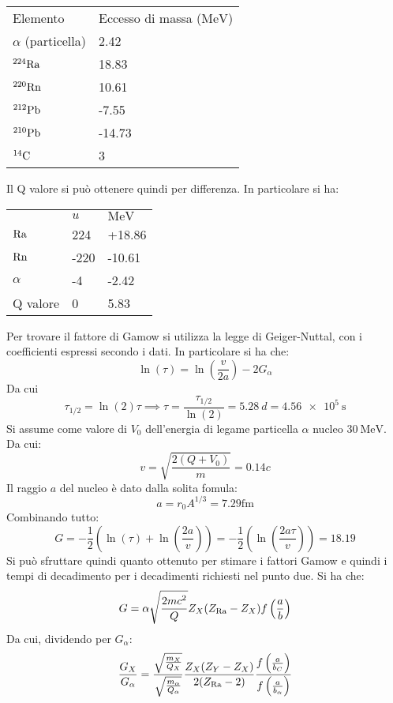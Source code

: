 \documentclass[../main.tex]{subfiles}
\begin{document}
\begin{svol}
			\begin{center}
			\begin{tabular}{ll}
				Elemento & Eccesso di massa ($\si{\mega\electronvolt}$) \\
				$ \alpha $ (particella) & 2.42 \\
				$ \mathrm{^{224}Ra} $ & 18.83 \\
				$ \mathrm{^{220}Rn} $ & 10.61 \\
				$ \mathrm{^{212}Pb} $ & -7.55 \\
				$ \mathrm{^{210}Pb} $ & -14.73 \\
				$ \mathrm{^{14}C} $ & 3 \\
			\end{tabular} 
			\end{center}
			Il Q valore si può ottenere quindi per differenza. In particolare si ha:
			\begin{center}
				\begin{tabular}{lll}
					& $ \si{u} $ & $ \si{\mega\electronvolt} $ \\
					$ \mathrm{Ra} $  & 224 & +18.86\\
					$ \mathrm{Rn} $  & -220 & -10.61 \\
					$ \alpha $ & -4 & -2.42 \\\hline
					Q valore & 0 & 5.83 \\
				\end{tabular}
			\end{center}
			Per trovare il fattore di Gamow si utilizza la legge di Geiger-Nuttal, con i coefficienti espressi secondo i dati. In particolare si ha che:
			\[ \ln(\tau)=\ln\left(\dfrac{v}{2a}\right)-2G_{\alpha} \]
			Da cui
			\[ \tau_{1/2}=\ln(2)\tau\implies\tau=\dfrac{\tau_{1/2}}{\ln(2)}=\SI{5.28}{d}=\SI{4.56e5}{\second} \]
			Si assume come valore di $ V_{0} $ dell'energia di legame particella $ \alpha $ nucleo $ \SI{30}{\mega\electronvolt} $. Da cui:
			\[ v=\sqrt{\dfrac{2(Q+V_{0})}{m}}=0.14c \]
			Il raggio $ a $ del nucleo è dato dalla solita fomula:
			\[ a=r_{0}A^{1/3}=7.29\si{\femto\meter} \]
			Combinando tutto:
			\[ G=-\dfrac{1}{2}\left(\ln(\tau)+\ln\left(\dfrac{2a}{v}\right)\right)=-\dfrac{1}{2}\left(\ln\left(\dfrac{2a\tau}{v}\right)\right)=18.19 \]
			Si può sfruttare quindi quanto ottenuto per stimare i fattori Gamow e quindi i tempi di decadimento per i decadimenti richiesti nel punto due. Si ha che:
			\[ G=\alpha\sqrt{\dfrac{2mc^{2}}{Q}}Z_{X}(Z_{\mathrm{Ra}}-Z_{X})f\left(\dfrac{a}{b}\right) \]
			Da cui, dividendo per $ G_{\alpha} $:
			\[ \dfrac{G_{X}}{G_{\alpha}}=\dfrac{\sqrt{\frac{m_{X}}{Q_{X}}}}{\sqrt{\frac{m_{\alpha}}{Q_{\alpha}}}}\dfrac{Z_{X}(Z_{Y}-Z_{X})}{2(Z_{\mathrm{Ra}}-2)}\dfrac{f\left(\frac{a}{b_{C}}\right)}{f\left(\frac{a}{b_{\alpha}}\right)} \]

\end{svol}
\end{document}
